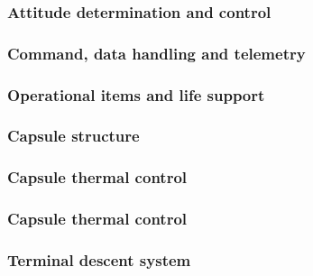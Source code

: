 

\subsubsection{Attitude determination and control} \label{subsec:adcs}


\subsubsection{Command, data handling and telemetry} \label{subsec:cdh}


\subsubsection{Operational items and life support} \label{subsec:crewop}


\subsubsection{Capsule structure} \label{subsec:crewstruc}


\subsubsection{Capsule thermal control} \label{subsec:crewthermalcontrol}


\subsubsection{Capsule thermal control} \label{subsec:pwer}


\subsubsection{Terminal descent system} \label{subsec:crewtermdescent}






